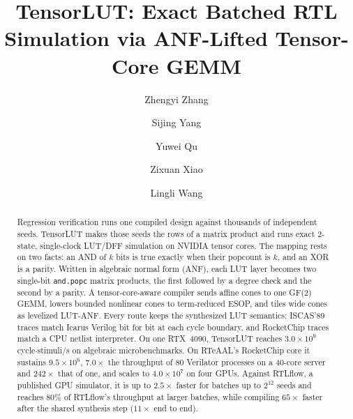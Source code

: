 \documentclass[sigconf]{acmart}
\newcommand{\mmapopc}{\texttt{and.popc}}
\begin{document}
\title{TensorLUT: Exact Batched RTL Simulation via ANF-Lifted Tensor-Core GEMM}

\author{Zhengyi Zhang}

\author{Sijing Yang}

\author{Yuwei Qu}

\author{Zixuan Xiao}

\author{Lingli Wang}

\renewcommand{\shortauthors}{Z. Zhang et al.}

\begin{abstract}
Regression verification runs one compiled design against thousands of independent seeds. TensorLUT
makes those seeds the rows of a matrix product and runs exact 2-state, single-clock LUT/DFF
simulation on NVIDIA tensor cores. The mapping rests on two facts: an AND of $k$ bits is true exactly
when their popcount is $k$, and an XOR is a parity. Written in algebraic normal form (ANF), each LUT
layer becomes two single-bit \mmapopc{} matrix products, the first followed by a degree check and the
second by a parity. A tensor-core-aware compiler sends affine cones to one GF(2) GEMM, lowers bounded
nonlinear cones to term-reduced ESOP, and tiles wide cones as levelized LUT-ANF. Every route keeps
the synthesized LUT semantics: ISCAS'89 traces match Icarus Verilog bit for bit at each cycle
boundary, and RocketChip traces match a CPU netlist interpreter. On
one RTX~4090, TensorLUT reaches $3.0\times10^9$ cycle$\cdot$stimuli/s on algebraic microbenchmarks.
On RTeAAL's RocketChip core it sustains $9.5\times10^6$, $7.0\times$ the throughput of 80 Verilator
processes on a 40-core server and $242\times$ that of one, and scales to $4.0\times10^7$ on four GPUs.
Against RTLflow, a published GPU simulator, it is up to $2.5\times$ faster for batches up to $2^{12}$
seeds and reaches 80\% of RTLflow's throughput at larger batches, while compiling $65\times$ faster
after the shared synthesis step ($11\times$ end to end).
\end{abstract}
\end{document}
